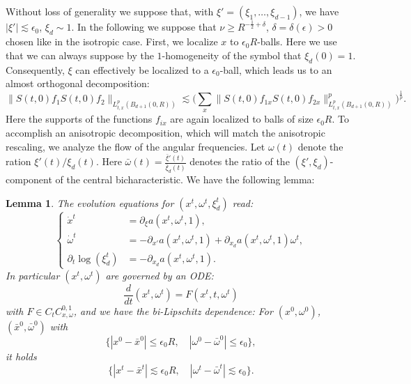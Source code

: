 \documentclass{amsart}
\newtheorem{lemma}[theorem]{Lemma}
\theoremstyle{definition}
\begin{document}
Without loss of generality we suppose that, with $\xi' = (\xi_1,\ldots,\xi_{d-1})$, we have  $|\xi'| \lesssim \epsilon_0$, $\xi_d \sim 1$. In the following we suppose that $\nu \geq R^{-\frac{1}{2}+\delta}$, $\delta = \delta(\epsilon)>0$ chosen like in the isotropic case. First, we localize $x$ to $\epsilon_0 R$-balls. Here we use that we can always suppose by the $1$-homogeneity of the symbol that $\xi_{d}(0) = 1$. 
Consequently, $\xi$ can effectively be localized to a $\epsilon_0$-ball, which leads us to an almost orthogonal decomposition:
\begin{equation*}
\| S(t,0) f_1 S(t,0) f_2 \|_{L^p_{t,x}(B_{d+1}(0,R))} \lesssim \big( \sum_{x} \| S(t,0) f_{1x} S(t,0) f_{2x} \|^p_{L^p_{t,x}(B_{d+1}(0,R))} \big)^{\frac{1}{p}}.
\end{equation*}
Here the supports of the functions $f_{ix}$ are again localized to balls of size $\epsilon_0 R$. To accomplish an anisotropic decomposition, which will match the anisotropic rescaling, we analyze the flow of the angular frequencies. Let $\omega(t)$ denote the ration $\xi'(t) / \xi_d(t)$. Here $\bar{\omega}(t) = \frac{\bar{\xi}'(t)}{\bar{\xi}_d(t)}$ denotes the ratio of the $(\xi',\xi_d)$-component of the central bicharacteristic. We have the following lemma:
\begin{lemma}
\label{lem:AnisotropicBiLipschitz}
The evolution equations for $(x^t, \omega^t, \xi_d^t)$ read:
\begin{equation}
\label{eq:ModifiedHamiltonian}
\left\{ \begin{array}{cl}
\dot{x}^t &= \partial_{\xi} a(x^t, \omega^t, 1), \\
\dot{\omega}^t &= - \partial_{x'} a(x^t,\omega^t,1) + \partial_{x_d} a(x^t,\omega^t,1) \omega^t, \\
\partial_t \log(\xi_d^t) &= - \partial_{x_d} a(x^t,\omega^t,1).
\end{array} \right.
\end{equation}
In particular $(x^t,\omega^t)$ are governed by an ODE:
\begin{equation*}
\frac{d}{dt} (x^t, \omega^t) = F(x^t,t,\omega^t)
\end{equation*}
with $F \in C_t C^{0,1}_{x,\omega}$, and we have the bi-Lipschitz dependence: For $(x^0,\omega^0)$, $(\bar{x}^0,\bar{\omega}^0)$ with 
\begin{equation*}
\{ |x^0 - \bar{x}^0| \leq \epsilon_0 R, \quad |\omega^0 - \bar{\omega}^0| \leq \epsilon_0 \},
\end{equation*}
it holds
\begin{equation*}
\{ |x^t - \bar{x}^t| \lesssim \epsilon_0 R, \quad |\omega^t - \bar{\omega}^t| \lesssim \epsilon_0 \}.
\end{equation*}
\end{lemma}
\end{document}
